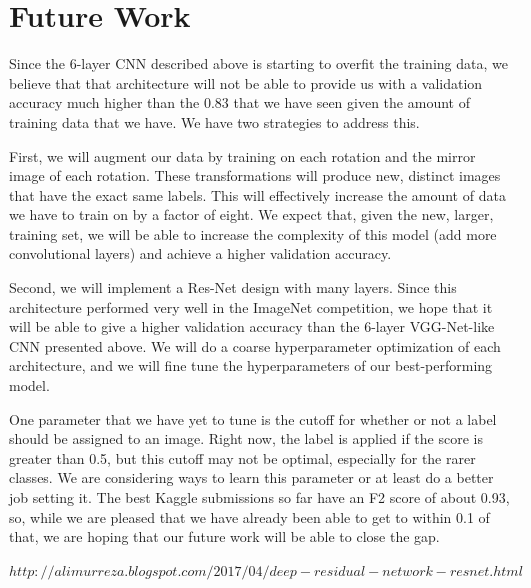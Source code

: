 \documentclass[10pt,twocolumn,letterpaper]{article}
\begin{document}
\section{Future Work}

Since the 6-layer CNN described above is starting to overfit the training data, we believe that that architecture will not be able to provide us with a validation accuracy much higher than the 0.83 that we have seen given the amount of training data that we have. We have two strategies to address this.

First, we will augment our data by training on each rotation and the mirror image of each rotation. These transformations will produce new, distinct images that have the exact same labels. This will effectively increase the amount of data we have to train on by a factor of eight. We expect that, given the new, larger, training set, we will be able to increase the complexity of this model (add more convolutional layers) and achieve a higher validation accuracy.

Second, we will implement a Res-Net design with many layers. Since this architecture performed very well in the ImageNet competition, we hope that it will be able to give a higher validation accuracy than the 6-layer VGG-Net-like CNN presented above. We will do a coarse hyperparameter optimization of each architecture, and we will fine tune the hyperparameters of our best-performing model.

One parameter that we have yet to tune is the cutoff for whether or not a label should be assigned to an image. Right now, the label is applied if the score is greater than 0.5, but this cutoff may not be optimal, especially for the rarer classes. We are considering ways to learn this parameter or at least do a better job setting it. The best Kaggle submissions so far have an F2 score of about 0.93, so, while we are pleased that we have already been able to get to within 0.1 of that, we are hoping that our future work will be able to close the gap.



{\small


}
$http://alimurreza.blogspot.com/2017/04/deep-residual-network-resnet.html$
\end{document}
